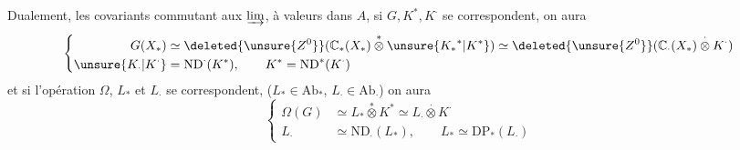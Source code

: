 Dualement,  les   covariants
commutant aux $\varinjlim$, à valeurs dans
$A$, si $G,K^*,K^\cdot$ se correspondent,
on aura
\[
\left\{\begin{aligned}
G(X_*)&\simeq\deleted{\unsure{Z^0}}(\mathbb C_*(X_*)\mathbin{\overset{*}{\otimes}}\unsure{{K_*}^*|K^*})
\simeq\deleted{\unsure{Z^0}}(\mathbb C_\cdot(X_*)\mathbin{\overset{\cdot}{\otimes}}K^\cdot)\\
\unsure{K_\cdot|K^\cdot}&=\mathrm{ND}^{\cdot}(K^*),\qquad K^*=\mathrm{ND}^*(K^\cdot)
\end{aligned}\right.
\]
et si l'opération $\Omega$, $L_*$ et $L_\cdot$ se
correspondent, ($L_*\in\mathrm{Ab}_*$, $L_\cdot\in\mathrm{Ab}_\cdot$)
on aura
\[
\left\{\begin{aligned}
\Omega(G)&\simeq L_*\mathbin{\overset{*}{\otimes}}K^*\simeq L_\cdot\mathbin{\overset{\cdot}{\otimes}}K^\cdot\\
L_\cdot&\simeq\mathrm{ND}_\cdot(L_*),\qquad L_*\simeq\mathrm{DP}_*(L_\cdot)
\end{aligned}\right.
\]
